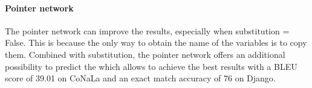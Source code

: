 \documentclass[11pt]{article}
\newcommand{\var}{\sc}
\begin{document}
\begin{table*}[htbp]
\caption{Comparisons of the systems trained without external data sources on {\selectfont CoNaLa} and {\selectfont Django} test sets.}
\label{table:sota}
\end{table*}


\paragraph{Pointer network} The pointer network can improve the results, especially when {\var substitution = False}. This is because the only way to obtain the name of the variables is to copy them. 
Combined with substitution, the pointer network offers an additional possibility to predict the  which allows to achieve the best results with a BLEU score of 39.01 on {\selectfont CoNaLa} and an exact match accuracy of 76 on {\selectfont Django}. 
\end{document}
